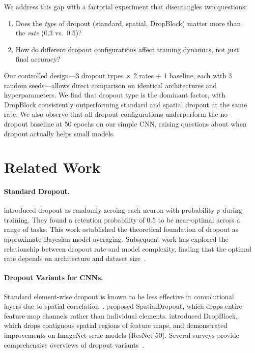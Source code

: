 \documentclass[11pt]{article}
\begin{document}
We address this gap with a factorial experiment that disentangles two questions:
\begin{enumerate}
    \item Does the \emph{type} of dropout (standard, spatial, DropBlock) matter more than the \emph{rate} (0.3 vs.\ 0.5)?
    \item How do different dropout configurations affect training dynamics, not just final accuracy?
\end{enumerate}

Our controlled design---3 dropout types $\times$ 2 rates $+$ 1 baseline, each with 3 random seeds---allows direct comparison on identical architectures and hyperparameters. We find that dropout type is the dominant factor, with DropBlock consistently outperforming standard and spatial dropout at the same rate. We also observe that all dropout configurations underperform the no-dropout baseline at 50 epochs on our simple CNN, raising questions about when dropout actually helps small models.

\section{Related Work}

\paragraph{Standard Dropout.}
\citet{srivastava2014} introduced dropout as randomly zeroing each neuron with probability $p$ during training. They found a retention probability of 0.5 to be near-optimal across a range of tasks. This work established the theoretical foundation of dropout as approximate Bayesian model averaging. Subsequent work has explored the relationship between dropout rate and model complexity, finding that the optimal rate depends on architecture and dataset size~\citep{dropoutcomplexity2021}.

\paragraph{Dropout Variants for CNNs.}
Standard element-wise dropout is known to be less effective in convolutional layers due to spatial correlation~\citep{labach2019}. \citet{tompson2015} proposed SpatialDropout, which drops entire feature map channels rather than individual elements. \citet{ghiasi2018} introduced DropBlock, which drops contiguous spatial regions of feature maps, and demonstrated improvements on ImageNet-scale models (ResNet-50). Several surveys provide comprehensive overviews of dropout variants~\citep{labach2019, dropoutsurvey2022, dropoutreview2023}.
\end{document}
